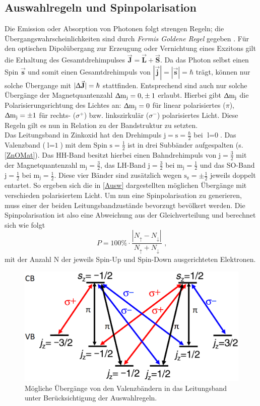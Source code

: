 \subsection{Auswahlregeln und Spinpolarisation}
\label{AusR}
Die Emission oder Absorption von Photonen folgt strengen Regeln; die Übergangswahrscheinlichkeiten sind durch \textit{Fermis Goldene Regel} gegeben \cite{Dirac.1927}. Für den optischen Dipolübergang zur Erzeugung oder Vernichtung eines Exzitons gilt die Erhaltung des Gesamtdrehimpulses $\vec{\textbf{J}}=\vec{\textbf{L}}+\vec{\textbf{S}}$. Da das Photon selbst einen Spin $\vec{\textbf{s}}$ und somit einen Gesamtdrehimpuls von $|\vec{\textbf{j}}|=|\vec{\textbf{s}}|=\hbar$ trägt, können nur solche Übergange mit $|\Updelta \vec{\textbf{J}}|=\hbar$ stattfinden. Entsprechend sind auch nur solche Übergänge der Magnetquantenzahl $\Updelta \text{m}_\text{j}=\text{0,}\pm \text{1}$ erlaubt. Hierbei gibt $\Updelta\text{m}_\text{j}$ die Polarisierungsrichtung des Lichtes an: $\Updelta\text{m}_\text{j}=\text{0}$ für linear polarisiertes ($\pi$), $\Updelta\text{m}_\text{j}=\pm\text{1}$ für rechts- ($\sigma^{+}$) bzw. linkszirkulär ($\sigma^{-}$) polarisiertes Licht. Diese Regeln gilt es nun in Relation zu der Bandstruktur zu setzten.\\
Das Leitungsband in Zinkoxid hat den Drehimpuls $\text{j}=\text{s}=\frac{\hbar}{\text{2}}$ bei $\text{l}=\text{0}$. Das Valenzband ($\text{l}=\text{1}$) mit dem Spin $\text{s}=\frac{1}{2}$
ist in drei Subbänder aufgespalten (s. \autoref{ZnOMat}). Das HH-Band besitzt hierbei einen Bahndrehimpuls von $\text{j}=\frac{3}{2}$ mit der Magnetquantenzahl $\text{m}_\text{j}=\frac{3}{2}$, das LH-Band $\text{j}=\frac{3}{2}$ bei $\text{m}_\text{j}=\frac{1}{2}$ und das SO-Band $\text{j}=\frac{1}{2}$ bei $\text{m}_\text{j}=\frac{1}{2}$. Diese vier Bänder sind zusätzlich wegen $\text{s}_\text{z}=\pm\frac{1}{2}$ jeweils doppelt entartet. So ergeben sich die in \autoref{Ausw} dargestellten möglichen Übergänge mit verschieden polarisiertem Licht. Um nun eine Spinpolarisation zu generieren, muss einer der beiden Leitungsbandzustände bevorzugt bevölkert werden. Die Spinpolarisation ist also eine Abweichung aus der Gleichverteilung und berechnet sich wie folgt
\begin{equation}
P=100\%\cdot \frac{\left| N_\uparrow- N_\downarrow\right|}{N_\uparrow+ N_\downarrow} \text{ ,}
\end{equation}
mit der Anzahl N der jeweils Spin-Up und Spin-Down ausgerichteten  Elektronen.
\begin{figure}[h]
\centering
\includegraphics[width=.5\textwidth]{Bilder/Vorbetrachtung/ausw}
\caption[Auswahlregeln]{Mögliche Übergänge von den Valenzbändern in das Leitungsband unter Berücksichtigung der Auswahlregeln.}
\label{Ausw}
\end{figure}
